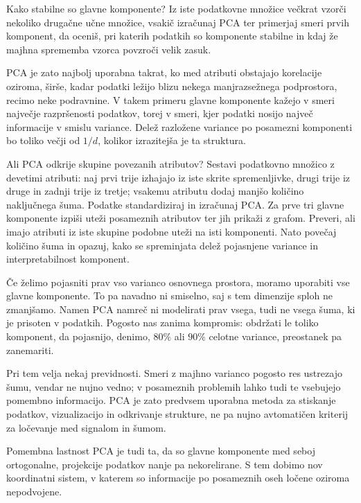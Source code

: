 \begin{exercise}{Kako stabilne so glavne komponente?}
Iz iste podatkovne množice večkrat vzorči nekoliko drugačne učne množice, vsakič izračunaj PCA ter primerjaj smeri prvih komponent, da oceniš, pri katerih podatkih so komponente stabilne in kdaj že majhna sprememba vzorca povzroči velik zasuk.
\end{exercise}

PCA je zato najbolj uporabna takrat, ko med atributi obstajajo korelacije oziroma, širše, kadar podatki ležijo blizu nekega manjrazsežnega podprostora, recimo neke podravnine. V takem primeru glavne komponente kažejo v smeri največje razpršenosti podatkov, torej v smeri, kjer podatki nosijo največ informacije v smislu variance. Delež razložene variance po posamezni komponenti bo toliko večji od \(1/d\), kolikor izrazitejša je ta struktura.

\begin{exercise}{Ali PCA odkrije skupine povezanih atributov?}
Sestavi podatkovno množico z devetimi atributi: naj prvi trije izhajajo iz iste skrite spremenljivke, drugi trije iz druge in zadnji trije iz tretje; vsakemu atributu dodaj manjšo količino naključnega šuma. Podatke standardiziraj in izračunaj PCA. Za prve tri glavne komponente izpiši uteži posameznih atributov ter jih prikaži z grafom. Preveri, ali imajo atributi iz iste skupine podobne uteži na isti komponenti. Nato povečaj količino šuma in opazuj, kako se spreminjata delež pojasnjene variance in interpretabilnost komponent.
\end{exercise}

Če želimo pojasniti prav vso varianco osnovnega prostora, moramo uporabiti vse glavne komponente. To pa navadno ni smiselno, saj s tem dimenzije sploh ne zmanjšamo. Namen PCA namreč ni modelirati prav vsega, tudi ne vsega šuma, ki je prisoten v podatkih. Pogosto nas zanima kompromis: obdržati le toliko komponent, da pojasnijo, denimo, \(80\%\) ali \(90\%\) celotne variance, preostanek pa zanemariti.

Pri tem velja nekaj previdnosti. Smeri z majhno varianco pogosto res ustrezajo šumu, vendar ne nujno vedno; v posameznih problemih lahko tudi te vsebujejo pomembno informacijo. PCA je zato predvsem uporabna metoda za stiskanje podatkov, vizualizacijo in odkrivanje strukture, ne pa nujno avtomatičen kriterij za ločevanje med signalom in šumom.

Pomembna lastnost PCA je tudi ta, da so glavne komponente med seboj ortogonalne, projekcije podatkov nanje pa nekorelirane. S tem dobimo nov koordinatni sistem, v katerem so informacije po posameznih oseh ločene oziroma nepodvojene.

